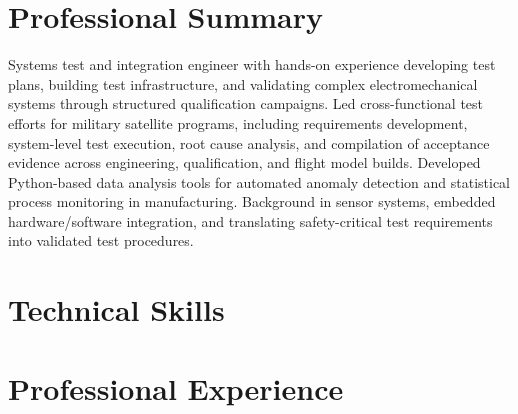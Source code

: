 \documentclass[letterpaper,11pt]{moderncv}
\begin{document}
\makecvtitle
\vspace{-3em}

\section{Professional Summary}
Systems test and integration engineer with hands-on experience developing test plans, building test infrastructure, and validating complex electromechanical systems through structured qualification campaigns. Led cross-functional test efforts for military satellite programs, including requirements development, system-level test execution, root cause analysis, and compilation of acceptance evidence across engineering, qualification, and flight model builds. Developed Python-based data analysis tools for automated anomaly detection and statistical process monitoring in manufacturing. Background in sensor systems, embedded hardware/software integration, and translating safety-critical test requirements into validated test procedures.

\section{Technical Skills}
\begin{minipage}[t]{0.48\textwidth}
\end{minipage}%
\hfill
\begin{minipage}[t]{0.48\textwidth}
\end{minipage}

\section{Professional Experience}
\end{document}
